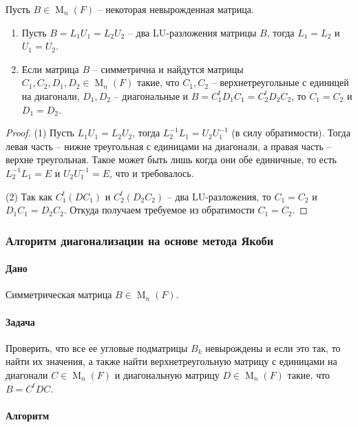 \begin{claim}
Пусть $B\in \operatorname{M}_n(F)$ -- некоторая невырожденная матрица.
\begin{enumerate}
\item Пусть $B = L_1 U_1 = L_2 U_2$ -- два LU-разложения матрицы $B$, тогда $L_1 = L_2$ и $U_1 = U_2$.

\item Если матрица $B$ -- симметрична и найдутся матрицы $C_1,C_2, D_1,D_2\in\operatorname{M}_n(F)$ такие, что $C_1, C_2$ -- верхнетреугольные с единицей на диагонали, $D_1, D_2$ -- диагональные и $B = C_1^t D_1 C_1 = C_2^t D_2 C_2$, то $C_1 = C_2$ и $D_1 = D_2$.
\end{enumerate}
\end{claim}
\begin{proof}
(1) Пусть $L_1 U_1 = L_2 U_2$, тогда $L_2^{-1}L_1 = U_2 U_1^{-1}$ (в силу обратимости).
Тогда левая часть -- нижне треугольная с единицами на диагонали, а правая часть -- верхне треугольная.
Такое может быть лишь когда они обе единичные, то есть $L_2^{-1} L_1 = E$ и $U_2 U_1^{-1} = E$, что и требовалось.

(2) Так как $C_1^t(DC_1)$ и $C_2^t(D_2 C_2)$ -- два LU-разложения, то $C_1 = C_2$ и $D_1C_1 = D_2C_2$.
Откуда получаем требуемое из обратимости $C_1 = C_2$.
\end{proof}

\subsubsection*{Алгоритм диагонализации на основе метода Якоби}

\paragraph{Дано}

Симметрическая матрица $B\in \operatorname{M}_n(F)$.

\paragraph{Задача}

Проверить, что все ее угловые подматрицы $B_k$ невырождены и если это так, то найти их значения, а также найти верхнетреугольную матрицу с единицами на диагонали $C\in \operatorname{M}_n(F)$ и диагональную матрицу $D\in\operatorname{M}_n(F)$ такие, что $B = C^t D C$.

\paragraph{Алгоритм}

